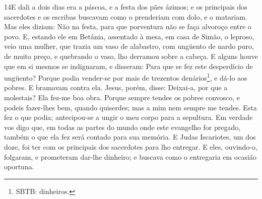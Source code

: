 \lettrine{14} E dali a dois dias era a páscoa, e a festa dos
pães ázimos; e os principais dos sacerdotes e os escribas buscavam
como o prenderiam com dolo, e o matariam. Mas eles diziam: Não
na festa, para que porventura não se faça alvoroço entre o povo.
E, estando ele em Betânia, assentado à mesa, em casa de Simão, o
leproso, veio uma mulher, que trazia um vaso de alabastro, com
ungüento de nardo puro, de muito preço, e quebrando o vaso, lho
derramou sobre a cabeça. E alguns houve que em si mesmos se
indignaram, e disseram: Para que se fez este desperdício de
ungüento? Porque podia vender-se por mais de trezentos
denários\footnote{SBTB: dinheiros.}, e dá-lo aos pobres. E bramavam
contra ela. Jesus, porém, disse: Deixai-a, por que a molestais?
Ela fez-me boa obra. Porque sempre tendes os pobres convosco, e
podeis fazer-lhes bem, quando quiserdes; mas a mim nem sempre me
tendes. Esta fez o que podia; antecipou-se a ungir o meu corpo
para a sepultura. Em verdade vos digo que, em todas as partes do
mundo onde este evangelho for pregado, também o que ela fez será
contado para sua memória. E Judas Iscariotes, um dos doze,
foi ter com os principais dos sacerdotes para lho entregar. E
eles, ouvindo-o, folgaram, e prometeram dar-lhe dinheiro; e buscava
como o entregaria em ocasião oportuna.

